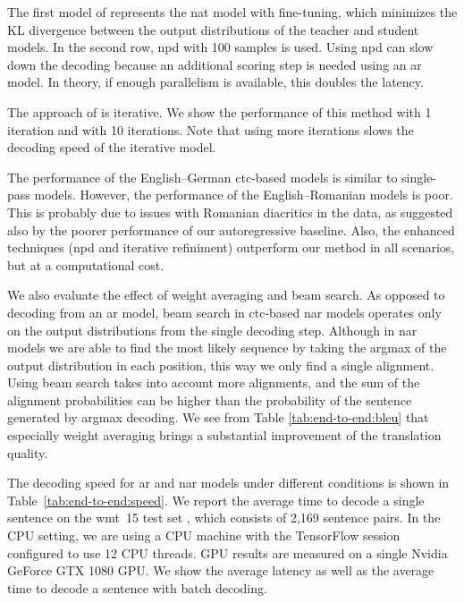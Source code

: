 The first model of \citet{gu2017nonautoregressive} represents the \ac{nat}
model with fine-tuning, which minimizes the KL divergence between the output
distributions of the teacher and student models. In the second row, \ac{npd}
with 100 samples is used. Using \ac{npd} can slow down the decoding because an
additional scoring step is needed using an \ac{ar} model. In theory, if enough
parallelism is available, this doubles the latency.

The approach of \citet{lee-etal-2018-deterministic} is iterative. We show the
performance of this method with 1 iteration and with 10 iterations. Note that
using more iterations slows the decoding speed of the iterative model.

The performance of the English--German \acs{ctc}-based models is similar to
single-pass models. However, the performance of the English--Romanian models is
poor. This is probably due to issues with Romanian diacritics in the data, as
suggested also by the poorer performance of our autoregressive baseline. Also,
the enhanced techniques (\ac{npd} and iterative refiniment) outperform our
method in all scenarios, but at a computational cost.

We also evaluate the effect of weight averaging and beam search. As opposed to
decoding from an \ac{ar} model, beam search in \acs{ctc}-based \ac{nar} models
operates only on the output distributions from the single decoding
step. Although in \ac{nar} models we are able to find the most likely sequence
by taking the argmax of the output distribution in each position, this way we
only find a single alignment. Using beam search takes into account more
alignments, and the sum of the alignment probabilities can be higher than the
probability of the sentence generated by argmax decoding. We see from Table
\ref{tab:end-to-end:bleu} that especially weight averaging brings a substantial
improvement of the translation quality.

The decoding speed for \ac{ar} and \ac{nar} models under different conditions
is shown in Table~\ref{tab:end-to-end:speed}. We report the average time to
decode a single sentence on the \ac{wmt}~15 test set
\citep{bojar-etal-2015-findings}, which consists of 2,169 sentence pairs. In
the CPU setting, we are using a CPU machine with the TensorFlow session
configured to use 12 CPU threads. GPU results are measured on a single Nvidia
GeForce GTX 1080 GPU. We show the average latency as well as the average time
to decode a sentence with batch decoding.

